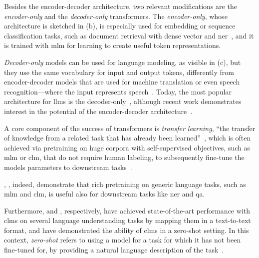 Besides the encoder-decoder architecture, two relevant modifications are the \emph{encoder-only} and the \emph{decoder-only} transformers. The \emph{encoder-only}, whose architecture is sketched in (b), is especially used for embedding or sequence classification tasks, such as document retrieval with dense vector and \acl{ner}~\cite{jm3,devlin-etal-2019-bert}, and it is trained with \ac{mlm} for learning to create useful token representations.

\emph{Decoder-only} models can be used for language modeling, as visible in (c), but they use the same vocabulary for input and output tokens, differently from encoder-decoder models that are used for machine translation or even speech recognition---where the input represents speech~\cite{jm3}.
%
Today, the most popular architecture for \acp{llm} is the decoder-only~\cite{zhang2025encoderdecodergemmaimprovingqualityefficiency,qorib-etal-2024-decoder}, although recent work demonstrates interest in the potential of the encoder-decoder architecture~\cite{zhang2025encoderdecodergemmaimprovingqualityefficiency}.

\medskip
\noindent
A core component of the success of transformers is \emph{transfer learning}, \ie ``the transfer of knowledge from a related task that has already been learned''~\cite{torrey2010transfer}, which is often achieved via pretraining on huge corpora with self-supervised objectives, such as \ac{mlm} or \ac{clm}, that do not require human labeling, to subsequently fine-tune the models parameters to downstream tasks~\cite{jm3,devlin-etal-2019-bert,radford2018improving,Raffel2020t5}.

\textcite{devlin-etal-2019-bert}, \textcite{radford2018improving}, indeed, demonstrate that rich pretraining on generic language tasks, such as \ac{mlm} and \ac{clm}, is useful also for downstream tasks like \acl{ner} and \acl{qa}.

Furthermore, \textcite{Raffel2020t5} and \textcite{radford2019unsupervised_learners}, respectively, have achieved state-of-the-art performance with \acp{clm} on several language understanding tasks by mapping them in a text-to-text format, and have demonstrated the ability of \acp{clm} in a zero-shot setting. In this context, \emph{zero-shot} refers to using a model for a task for which it has not been fine-tuned for, by providing a natural language description of the task~\cite{gpt_lm_few_shot_learners_2020}.


